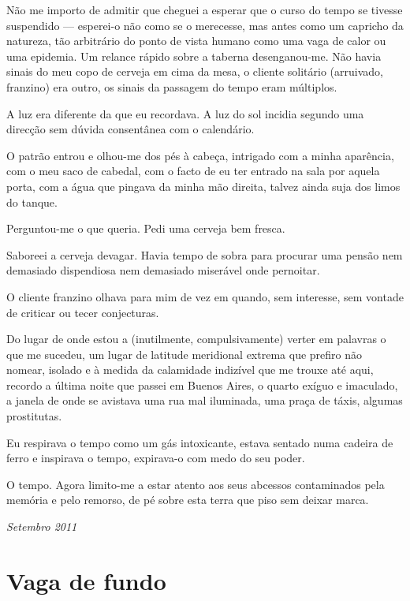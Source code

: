 Não me importo de admitir que cheguei a esperar que o
curso do tempo se tivesse suspendido --- esperei-o não como se o
merecesse, mas antes como um capricho da natureza, tão arbitrário do
ponto de vista humano como uma vaga de calor ou uma epidemia. Um relance
rápido sobre a taberna desenganou-me. Não havia sinais do meu copo de
cerveja em cima da mesa, o cliente solitário (arruivado, franzino) era
outro, os sinais da passagem do tempo eram múltiplos.

A luz era diferente da que eu recordava. A luz do sol incidia segundo
uma direcção sem dúvida consentânea com o calendário.

O patrão entrou e olhou-me dos pés à cabeça, intrigado com a minha
aparência, com o meu saco de cabedal, com o facto de eu ter entrado na
sala por aquela porta, com a água que pingava da minha mão direita,
talvez ainda suja dos limos do tanque.

Perguntou-me o que queria. Pedi uma cerveja bem fresca.

Saboreei a
cerveja devagar. Havia tempo de sobra para procurar uma pensão nem
demasiado dispendiosa nem demasiado miserável onde pernoitar.

O cliente franzino olhava para mim de vez em quando, sem interesse, sem
vontade de criticar ou tecer conjecturas.

Do lugar de onde estou a (inutilmente, compulsivamente) verter em
palavras o que me sucedeu, um lugar de latitude meridional extrema que
prefiro não nomear, isolado e à medida da calamidade indizível que me
trouxe até aqui, recordo a última noite que passei em Buenos Aires, o
quarto exíguo e imaculado, a janela de onde se avistava uma rua mal
iluminada, uma praça de táxis, algumas prostitutas.

Eu respirava o tempo como um gás intoxicante, estava sentado numa
cadeira de ferro e inspirava o tempo, expirava-o com medo do seu poder.

O tempo. Agora limito-me a estar atento aos seus abcessos contaminados
pela memória e pelo remorso, de pé sobre esta terra que piso sem deixar
marca.

\begin{flushright}
\emph{Setembro 2011}
\end{flushright}

\chapter{Vaga de fundo}


